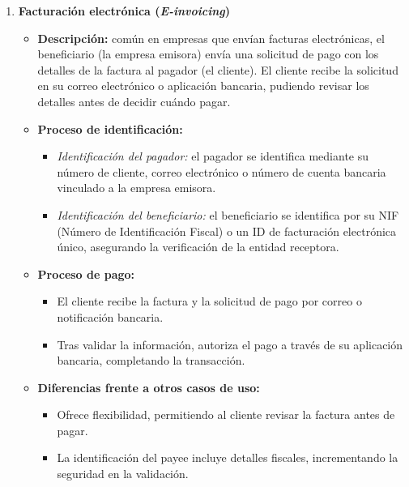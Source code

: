 \begin{enumerate}
    \item \textbf{Facturación electrónica (\textit{E-invoicing})}
    \begin{itemize}
        \item \textbf{Descripción:} común en empresas que envían facturas electrónicas, el beneficiario (la empresa emisora) envía una solicitud de pago con los detalles de la factura al pagador (el cliente). El cliente recibe la solicitud en su correo electrónico o aplicación bancaria, pudiendo revisar los detalles antes de decidir cuándo pagar.
        \item \textbf{Proceso de identificación:}
        \begin{itemize}
            \item \textit{Identificación del pagador:} el pagador se identifica mediante su número de cliente, correo electrónico o número de cuenta bancaria vinculado a la empresa emisora.
            \item \textit{Identificación del beneficiario:} el beneficiario se identifica por su NIF (Número de Identificación Fiscal) o un ID de facturación electrónica único, asegurando la verificación de la entidad receptora.
        \end{itemize}
        \item \textbf{Proceso de pago:}
        \begin{itemize}
            \item El cliente recibe la factura y la solicitud de pago por correo o notificación bancaria.
            \item Tras validar la información, autoriza el pago a través de su aplicación bancaria, completando la transacción.
        \end{itemize}
        \item \textbf{Diferencias frente a otros casos de uso:}
        \begin{itemize}
            \item Ofrece flexibilidad, permitiendo al cliente revisar la factura antes de pagar.
            \item La identificación del payee incluye detalles fiscales, incrementando la seguridad en la validación.
        \end{itemize}
    \end{itemize}


\end{enumerate}
